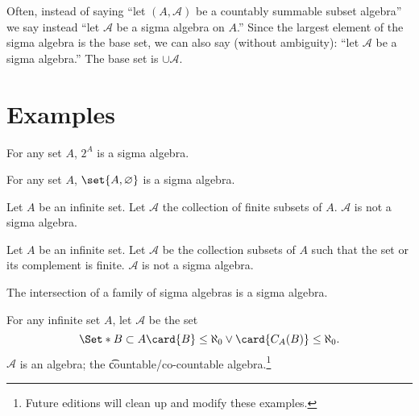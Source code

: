 Often, instead of saying ``let $(A, \mathcal{A} )$ be a countably summable subset algebra'' we say instead ``let $\mathcal{A} $ be a sigma algebra on $A$.''
Since the largest element of the sigma algebra is the base set, we can also say (without ambiguity): ``let $\mathcal{A} $ be a sigma algebra.''
The base set is $\cup \mathcal{A} $.

\section*{Examples}

\begin{example}
For any set $A$, $2^{A}$ is a sigma algebra.
\end{example}

\begin{example}
For any set $A$,
$\set{A, \varnothing}$ is a sigma algebra.
\end{example}

\begin{example}
Let $A$ be an infinite set.
Let $\mathcal{A} $ the collection of finite subsets of $A$.
$\mathcal{A} $ is not a sigma algebra.
\end{example}

\begin{example}
Let $A$ be an infinite set.
Let $\mathcal{A} $ be the collection
subsets of $A$ such that the set or its
complement is finite.
$\mathcal{A} $ is not a sigma algebra.
\end{example}

\begin{proposition}

\label{sigma_algebra:sigmaintersection}The intersection of a family of sigma algebras is a sigma algebra.
\end{proposition}

\begin{example}
For any infinite set $A$, let $\mathcal{A} $ be the set
\[
\Set*{
B \subset A
}{
\card{B} \leq \aleph_0 \lor
\card{C_{A}(B)} \leq \aleph_0
}.
\]
$\mathcal{A} $ is an algebra; the \t{countable/co-countable algebra}.\footnote{Future editions will clean up and modify these examples.}
\end{example}
